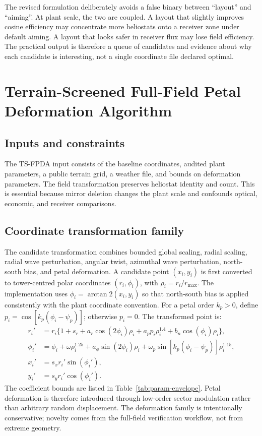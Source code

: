 \documentclass[final,3p,times]{elsarticle}
\begin{document}
The revised formulation deliberately avoids a false binary between ``layout'' and ``aiming''. At plant scale, the two are coupled. A layout that slightly improves cosine efficiency may concentrate more heliostats onto a receiver zone under default aiming. A layout that looks safer in receiver flux may lose field efficiency. The practical output is therefore a queue of candidates and evidence about why each candidate is interesting, not a single coordinate file declared optimal.

\section{Terrain-Screened Full-Field Petal Deformation Algorithm}
\subsection{Inputs and constraints}
The TS-FPDA input consists of the baseline coordinates, audited plant parameters, a public terrain grid, a weather file, and bounds on deformation parameters. The field transformation preserves heliostat identity and count. This is essential because mirror deletion changes the plant scale and confounds optical, economic, and receiver comparisons.

\subsection{Coordinate transformation family}
The candidate transformation combines bounded global scaling, radial scaling, radial wave perturbation, angular twist, azimuthal wave perturbation, north-south bias, and petal deformation. A candidate point $(x_i,y_i)$ is first converted to tower-centred polar coordinates $(r_i,\phi_i)$, with $\rho_i=r_i/r_{\max}$. The implementation uses $\phi_i=\arctan2(x_i,y_i)$ so that north-south bias is applied consistently with the plant coordinate convention. For a petal order $k_p>0$, define $p_i=\cos[k_p(\phi_i-\psi_p)]$; otherwise $p_i=0$. The transformed point is:
\begin{align}
r_i' &= r_i\{1+s_r+a_r\cos(2\phi_i)\rho_i+a_p p_i\rho_i^{1.4}+b_n\cos(\phi_i)\rho_i\},\\
\phi_i' &= \phi_i+\omega \rho_i^{1.25}+a_\phi\sin(2\phi_i)\rho_i+\omega_p\sin[k_p(\phi_i-\psi_p)]\rho_i^{1.15},\\
x_i' &= s_x r_i' \sin(\phi_i'),\\
y_i' &= s_y r_i' \cos(\phi_i').
\end{align}
The coefficient bounds are listed in Table~\ref{tab:param-envelope}. Petal deformation is therefore introduced through low-order sector modulation rather than arbitrary random displacement. The deformation family is intentionally conservative; novelty comes from the full-field verification workflow, not from extreme geometry.
\end{document}
